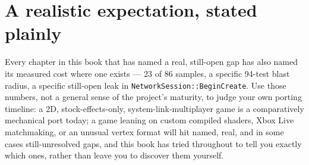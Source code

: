 \section{A realistic expectation, stated plainly}

Every chapter in this book that has named a real, still-open gap has also named its measured
cost where one exists --- 23 of 86 samples, a specific 94-test blast radius, a specific
still-open leak in \texttt{NetworkSession::BeginCreate}. Use those numbers, not a general
sense of the project's maturity, to judge your own porting timeline: a 2D, stock-effects-only,
system-link-multiplayer game is a comparatively mechanical port today; a game leaning on
custom compiled shaders, Xbox Live matchmaking, or an unusual vertex format will hit named,
real, and in some cases still-unresolved gaps, and this book has tried throughout to tell you
exactly which ones, rather than leave you to discover them yourself.
